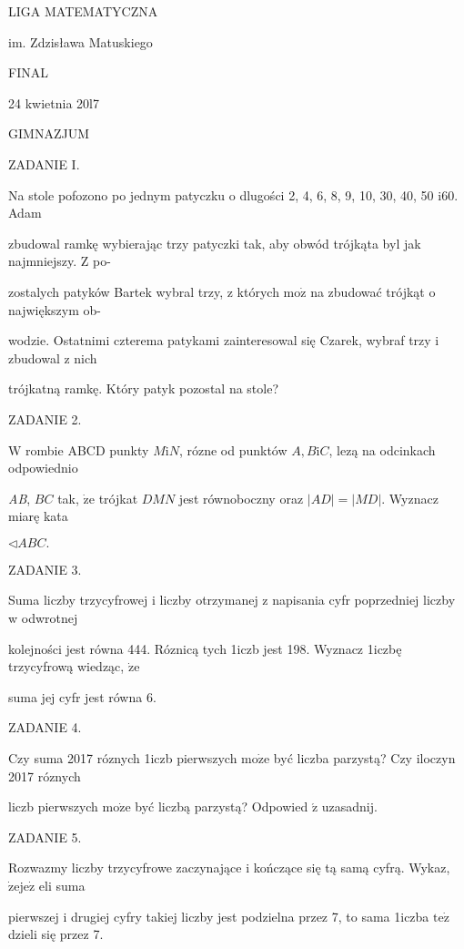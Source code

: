 \documentclass[a4paper,12pt]{article}
\begin{document}
LIGA MATEMATYCZNA

im. Zdzisława Matuskiego

FINAL

24 kwietnia 20l7

GIMNAZJUM

ZADANIE I.

Na stole pofozono po jednym patyczku o dlugości 2, 4, 6, 8, 9, 10, 30, 40, 50 $\mathrm{i}60$. Adam

zbudowal ramkę wybierając trzy patyczki tak, aby obwód trójkąta byl jak najmniejszy. $\mathrm{Z}$ po-

zostalych patyków Bartek wybral trzy, z których $\mathrm{m}\mathrm{o}\dot{\mathrm{z}}$ na zbudować trójkąt o największym ob-

wodzie. Ostatnimi czterema patykami zainteresowal się Czarek, wybraf trzy i zbudowal z nich

trójkatną ramkę. Który patyk pozostal na stole?

ZADANIE 2.

$\mathrm{W}$ rombie ABCD punkty $M\mathrm{i}N$, rózne od punktów $A, B\mathrm{i}C$, lezą na odcinkach odpowiednio

{\it AB}, $BC$ tak, $\dot{\mathrm{z}}\mathrm{e}$ trójkat $DMN$ jest równoboczny oraz $|AD| = |MD|$. Wyznacz miarę kata

$\triangleleft ABC.$

ZADANIE 3.

Suma liczby trzycyfrowej i liczby otrzymanej z napisania cyfr poprzedniej liczby w odwrotnej

kolejności jest równa 444. Róznicą tych 1iczb jest 198. Wyznacz 1iczbę trzycyfrową wiedząc, $\dot{\mathrm{z}}\mathrm{e}$

suma jej cyfr jest równa 6.

ZADANIE 4.

Czy suma 2017 róznych 1iczb pierwszych $\mathrm{m}\mathrm{o}\dot{\mathrm{z}}\mathrm{e}$ być liczba parzystą? Czy iloczyn 2017 róznych

liczb pierwszych $\mathrm{m}\mathrm{o}\dot{\mathrm{z}}\mathrm{e}$ być liczbą parzystą? Odpowied $\acute{\mathrm{z}}$ uzasadnij.

ZADANIE 5.

Rozwazmy liczby trzycyfrowe zaczynające i kończące się tą samą cyfrą. Wykaz, $\dot{\mathrm{z}}\mathrm{e}\mathrm{j}\mathrm{e}\dot{\mathrm{z}}$ eli suma

pierwszej i drugiej cyfry takiej liczby jest podzielna przez 7, to sama 1iczba $\mathrm{t}\mathrm{e}\dot{\mathrm{z}}$ dzieli się przez 7.
\end{document}
